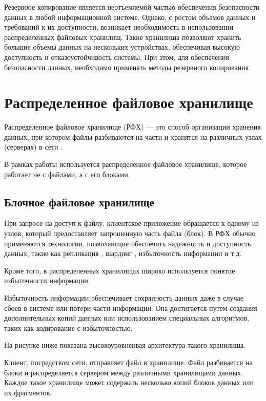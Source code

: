 Резервное копирование является неотъемлемой частью обеспечения безопасности данных в любой информационной системе. 
Однако, с ростом объемов данных и требований к их доступности, возникает необходимость в использовании распределенных файловых хранилищ.
Такие хранилища позволяют хранить большие объемы данных на нескольких устройствах, обеспечивая высокую доступность и отказоустойчивость системы. 
При этом, для обеспечения безопасности данных, необходимо применять методы резервного копирования.

\section{Распределенное файловое хранилище}

Распределенное файловое хранилище (РФХ) --- это способ организации хранения данных, при котором файлы разбиваются на части и хранятся на различных узлах (серверах) в сети \cite{distributed-fs}. 

В рамках работы используется распределенное файловое хранилище, которое работает не с файлами, а с его блоками. 

\subsection{Блочное файловое хранилище}
При запросе на доступ к файлу, клиентское приложение обращается к одному из узлов, который предоставляет запрошенную часть файла (блок).  
В РФХ обычно применяются технологии, позволяющие обеспечить надежность и доступность данных, такие как репликация \cite{replication}, шардинг \cite{sharding}, избыточность информации и т.д.

Кроме того, в распределенных хранилищах широко используется понятие избыточности информации. 

Избыточность информации обеспечивает сохранность данных даже в случае сбоев в системе или потери части информации. 
Она достигается путем создания дополнительных копий данных или использованием специальных алгоритмов, таких как кодирование с избыточностью.
\newpage

На рисунке ниже показана высокоуровненвая архитектура такого хранилища.  


Клиент, посредством сети, отправляет файл в хранилище. Файл разбивается на блоки и распределяется сервером между различными хранилищами данных. Каждое такое хранилище может содержать несколько копий блоков данных или их фрагментов. 

